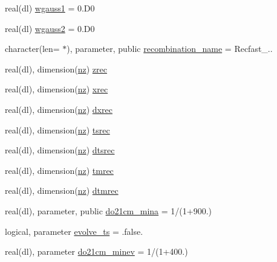 \begin{DoxyCompactItemize}
\item 
real(dl) \mbox{\hyperlink{namespacerecombination_ab96e636bde8533901e6404afddd90371}{wgauss1}} = 0.\+D0
\item 
real(dl) \mbox{\hyperlink{namespacerecombination_ae8e9ce09a4cbc8282433bb03744dee31}{wgauss2}} = 0.\+D0
\item 
character(len= $\ast$), parameter, public \mbox{\hyperlink{namespacerecombination_aaaa9430d72f4f49786d010958342bc72}{recombination\+\_\+name}} = \textquotesingle{}Recfast\+\_..\textquotesingle{}
\item 
real(dl), dimension(\mbox{\hyperlink{namespacerecombination_a2ebf98b22953bfe18fb372dd8e330d3e}{nz}}) \mbox{\hyperlink{namespacerecombination_ace51a9fec7f3c178e99caf82c7cc6de0}{zrec}}
\item 
real(dl), dimension(\mbox{\hyperlink{namespacerecombination_a2ebf98b22953bfe18fb372dd8e330d3e}{nz}}) \mbox{\hyperlink{namespacerecombination_a43d25f6d69d2b60682ef49868e8f70cd}{xrec}}
\item 
real(dl), dimension(\mbox{\hyperlink{namespacerecombination_a2ebf98b22953bfe18fb372dd8e330d3e}{nz}}) \mbox{\hyperlink{namespacerecombination_a34b4e0fe310c9f5d1705a2e78983d9fa}{dxrec}}
\item 
real(dl), dimension(\mbox{\hyperlink{namespacerecombination_a2ebf98b22953bfe18fb372dd8e330d3e}{nz}}) \mbox{\hyperlink{namespacerecombination_aa13c7a29f1e2c1bb0db8f0f4e6c4cbaa}{tsrec}}
\item 
real(dl), dimension(\mbox{\hyperlink{namespacerecombination_a2ebf98b22953bfe18fb372dd8e330d3e}{nz}}) \mbox{\hyperlink{namespacerecombination_a05ee59d76dcf3b0345da845ed7980073}{dtsrec}}
\item 
real(dl), dimension(\mbox{\hyperlink{namespacerecombination_a2ebf98b22953bfe18fb372dd8e330d3e}{nz}}) \mbox{\hyperlink{namespacerecombination_a49d87db76377445504ec6505faa4da09}{tmrec}}
\item 
real(dl), dimension(\mbox{\hyperlink{namespacerecombination_a2ebf98b22953bfe18fb372dd8e330d3e}{nz}}) \mbox{\hyperlink{namespacerecombination_a56809fd170a698f38efdc76471379237}{dtmrec}}
\item 
real(dl), parameter, public \mbox{\hyperlink{namespacerecombination_a9f9ad56161c0922d8b742775d30db0dd}{do21cm\+\_\+mina}} = 1/(1+900.)
\item 
logical, parameter \mbox{\hyperlink{namespacerecombination_ab91e25d9cc8fed5d1aa39540e9f90c59}{evolve\+\_\+ts}} = .false.
\item 
real(dl), parameter \mbox{\hyperlink{namespacerecombination_a78245c71ab308bd902e38d4505ff4554}{do21cm\+\_\+minev}} = 1/(1+400.)

\end{DoxyCompactItemize}
